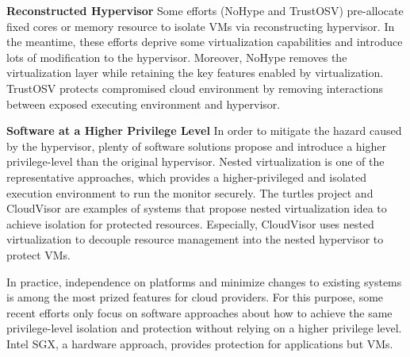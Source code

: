 \documentclass[conference]{IEEEtran}
\begin{document}
\textbf{Reconstructed Hypervisor }
Some efforts (NoHype\cite{NoHype} and TrustOSV\cite{TrustOSV}) pre-allocate fixed cores or memory resource to isolate VMs via reconstructing hypervisor. In the meantime, these efforts deprive some virtualization capabilities and introduce lots of modification to the hypervisor. Moreover, NoHype removes the virtualization layer while retaining the key features enabled by virtualization. TrustOSV protects compromised cloud environment by removing interactions between exposed executing environment and hypervisor.

 
\textbf{Software at a Higher Privilege Level}
In order to mitigate the hazard caused by the hypervisor, plenty of software solutions propose and introduce a higher privilege-level than the original hypervisor. Nested virtualization is one of the representative approaches, which provides a higher-privileged and isolated execution environment to run the monitor securely. The turtles project \cite{Ben2007The} and CloudVisor \cite{Zhang2011CloudVisor} are examples of systems that propose nested virtualization idea to achieve isolation for protected resources. Especially, CloudVisor uses nested virtualization to decouple resource management into the nested hypervisor to protect VMs. %

In practice, independence on platforms and minimize changes to existing systems is among the most prized features for cloud providers. For this purpose,
some recent efforts only focus on software approaches about how to achieve the same privilege-level isolation and protection without relying on a higher privilege level. 
 Intel SGX, a hardware approach, provides protection for applications but VMs. %
\end{document}
